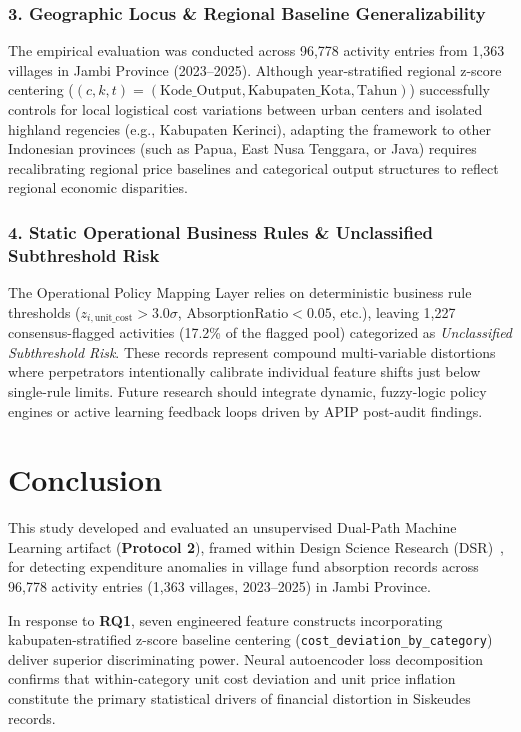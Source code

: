 \documentclass[runningheads]{llncs}
\begin{document}
\subsubsection{3. Geographic Locus \& Regional Baseline Generalizability}
The empirical evaluation was conducted across 96,778 activity entries from 1,363 villages in Jambi Province (2023--2025). Although year-stratified regional z-score centering ($(c,k,t) = (\text{Kode\_Output}, \text{Kabupaten\_Kota}, \text{Tahun})$) successfully controls for local logistical cost variations between urban centers and isolated highland regencies (e.g., Kabupaten Kerinci), adapting the framework to other Indonesian provinces (such as Papua, East Nusa Tenggara, or Java) requires recalibrating regional price baselines and categorical output structures to reflect regional economic disparities.

\subsubsection{4. Static Operational Business Rules \& Unclassified Subthreshold Risk}
The Operational Policy Mapping Layer relies on deterministic business rule thresholds ($z_{i, \text{unit\_cost}} > 3.0\sigma$, $\text{AbsorptionRatio} < 0.05$, etc.), leaving 1,227 consensus-flagged activities (17.2\% of the flagged pool) categorized as \textit{Unclassified Subthreshold Risk}. These records represent compound multi-variable distortions where perpetrators intentionally calibrate individual feature shifts just below single-rule limits. Future research should integrate dynamic, fuzzy-logic policy engines or active learning feedback loops driven by APIP post-audit findings.

\section{Conclusion}

This study developed and evaluated an unsupervised Dual-Path Machine Learning artifact (\textbf{Protocol 2}), framed within Design Science Research (DSR)~\cite{ref10}, for detecting expenditure anomalies in village fund absorption records across 96,778 activity entries (1,363 villages, 2023--2025) in Jambi Province.

In response to \textbf{RQ1}, seven engineered feature constructs incorporating kabupaten-stratified z-score baseline centering (\texttt{cost\_deviation\_by\_category}) deliver superior discriminating power. Neural autoencoder loss decomposition confirms that within-category unit cost deviation and unit price inflation constitute the primary statistical drivers of financial distortion in Siskeudes records.
\end{document}
